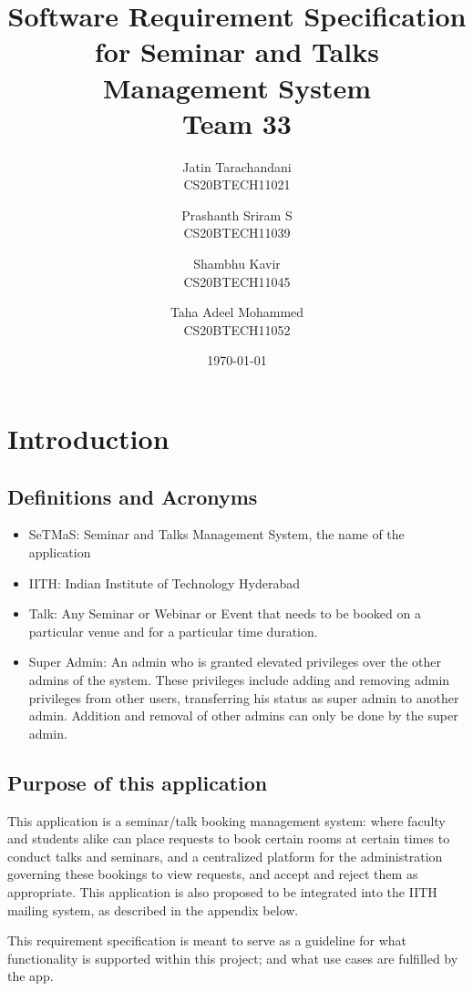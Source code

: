 \documentclass{article}
\title{\vspace*{4cm}\textbf{Software Requirement Specification for Seminar and Talks Management System\vspace*{0.4cm}\\Team 33\vspace*{0.2cm}}}
\author{Jatin Tarachandani \\\small{CS20BTECH11021} \and Prashanth Sriram S \\\small{CS20BTECH11039}   \and Shambhu Kavir \\\small{CS20BTECH11045} \and Taha Adeel Mohammed \\\small{CS20BTECH11052} \vspace*{0.4cm} }
\date{\today}
\begin{document}
\maketitle



\newpage

\tableofcontents

\newpage

\section{Introduction}

\subsection{Definitions and Acronyms}
\begin{itemize}
    \item SeTMaS: Seminar and Talks Management System, the name of the application
    \item IITH: Indian Institute of Technology Hyderabad
    \item Talk: Any Seminar or Webinar or Event that needs to be booked on a particular venue and for a particular time duration.
    \item Super Admin: An admin who is granted elevated privileges over the other admins of the system. These privileges include adding and removing admin privileges from other users, transferring his status as super admin to another admin. Addition and removal of other admins can only be done by the super admin. 
\end{itemize}

\subsection{Purpose of this application}
This application is a seminar/talk booking management system: where faculty and students alike can place requests to book certain rooms at certain times to conduct talks and seminars, and a centralized platform for the administration governing these bookings to view requests, and accept and reject them as appropriate. This application  is also proposed to be integrated into the IITH mailing system, as described in the appendix below. 

This requirement specification is meant to serve as a guideline for what functionality is supported within this project; and what use cases are fulfilled by the app. 
\end{document}
